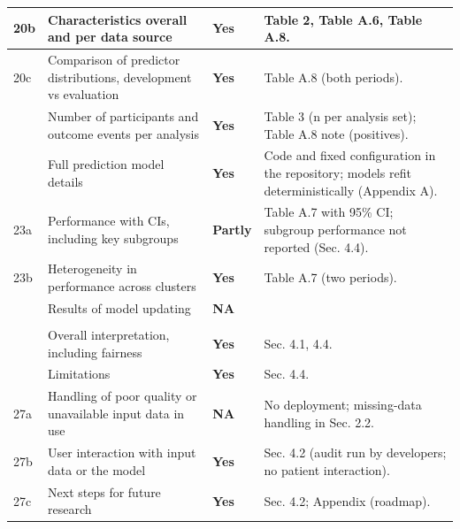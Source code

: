 \documentclass[9pt]{extarticle}
\begin{document}
\begin{longtable}{>{\raggedright\arraybackslash}p{1.0cm}>{\raggedright\arraybackslash}p{7.2cm}>{\centering\arraybackslash}p{1.4cm}>{\raggedright\arraybackslash}p{14.6cm}}
20b & Characteristics overall and per data source & \textbf{Yes} & Table 2, Table A.6, Table A.8.\\ \midrule
20c & Comparison of predictor distributions, development vs evaluation & \textbf{Yes} & Table A.8 (both periods).\\ \midrule
21 & Number of participants and outcome events per analysis & \textbf{Yes} & Table 3 (n per analysis set); Table A.8 note (positives).\\ \midrule
22 & Full prediction model details & \textbf{Yes} & Code and fixed configuration in the repository; models refit deterministically (Appendix A).\\ \midrule
23a & Performance with CIs, including key subgroups & \textbf{Partly} & Table A.7 with 95\% CI; subgroup performance not reported (Sec. 4.4).\\ \midrule
23b & Heterogeneity in performance across clusters & \textbf{Yes} & Table A.7 (two periods).\\ \midrule
24 & Results of model updating & \textbf{NA} & \\ \midrule
\multicolumn{4}{l}{\textbf{Discussion}}\\ \midrule
25 & Overall interpretation, including fairness & \textbf{Yes} & Sec. 4.1, 4.4.\\ \midrule
26 & Limitations & \textbf{Yes} & Sec. 4.4.\\ \midrule
27a & Handling of poor quality or unavailable input data in use & \textbf{NA} & No deployment; missing-data handling in Sec. 2.2.\\ \midrule
27b & User interaction with input data or the model & \textbf{Yes} & Sec. 4.2 (audit run by developers; no patient interaction).\\ \midrule
27c & Next steps for future research & \textbf{Yes} & Sec. 4.2; Appendix (roadmap).\\ \midrule
\end{longtable}
\end{document}
